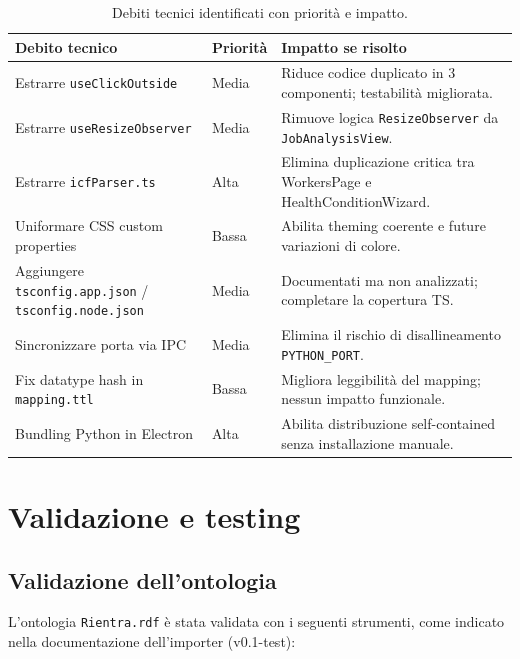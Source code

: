 \documentclass[a4paper,12pt]{article}
\begin{document}
\begin{table}[H]
\centering
\caption{Debiti tecnici identificati con priorit\`{a} e impatto.}
\begin{tabular}{L{4.5cm} L{2cm} L{6cm}}
\toprule
\textbf{Debito tecnico} & \textbf{Priorit\`{a}} & \textbf{Impatto se risolto} \\
\midrule
Estrarre \texttt{useClickOutside} & Media &
  Riduce codice duplicato in 3 componenti; testabilit\`{a} migliorata. \\[3pt]
Estrarre \texttt{useResizeObserver} & Media &
  Rimuove logica \texttt{ResizeObserver} da \texttt{JobAnalysisView}. \\[3pt]
Estrarre \texttt{icfParser.ts} & Alta &
  Elimina duplicazione critica tra WorkersPage e HealthConditionWizard. \\[3pt]
Uniformare CSS custom properties & Bassa &
  Abilita theming coerente e future variazioni di colore. \\[3pt]
Aggiungere \texttt{tsconfig.app.json} / \texttt{tsconfig.node.json} & Media &
  Documentati ma non analizzati; completare la copertura TS. \\[3pt]
Sincronizzare porta via IPC & Media &
  Elimina il rischio di disallineamento \texttt{PYTHON\_PORT}. \\[3pt]
Fix datatype hash in \texttt{mapping.ttl} & Bassa &
  Migliora leggibilit\`{a} del mapping; nessun impatto funzionale. \\[3pt]
Bundling Python in Electron & Alta &
  Abilita distribuzione self-contained senza installazione manuale. \\
\bottomrule
\end{tabular}
\end{table}

\section{Validazione e testing}

\subsection{Validazione dell'ontologia}

L'ontologia \texttt{Rientra.rdf} \`{e} stata validata con i seguenti
strumenti, come indicato nella documentazione dell'importer (v0.1-test):
\end{document}
